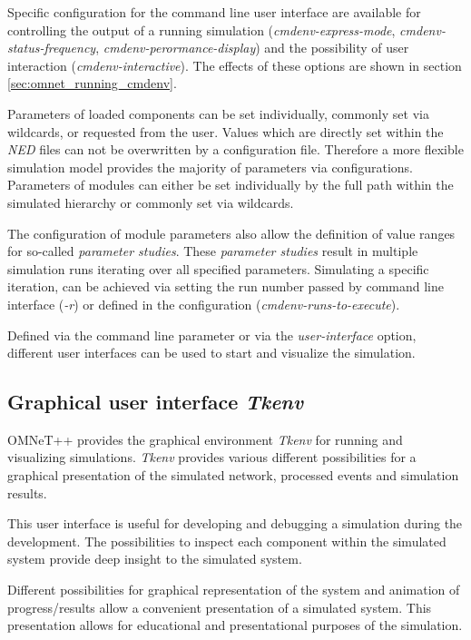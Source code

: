 Specific configuration for the command line user interface are available for controlling the output of a running simulation (\emph{cmdenv-express-mode}, \emph{cmdenv-status-frequency}, \emph{cmdenv-perormance-display}) and the possibility of user interaction (\emph{cmdenv-interactive}).
The effects of these options are shown in section \ref{sec:omnet_running_cmdenv}.

Parameters of loaded components can be set individually, commonly set via wildcards, or requested from the user.
Values which are directly set within the \emph{NED} files can not be overwritten by a configuration file.
Therefore a more flexible simulation model provides the majority of parameters via configurations.
Parameters of modules can either be set individually by the full path within the simulated hierarchy or commonly set via wildcards. \cite[section 9.3]{omnet_manual}

\begin{sloppypar}
The configuration of module parameters also allow the definition of value ranges for so-called \emph{parameter studies}.
These \emph{parameter studies} result in multiple simulation runs iterating over all specified parameters.
Simulating a specific iteration, can be achieved via setting the run number passed by command line interface (\emph{-r}) or defined in the configuration (\mbox{\emph{cmdenv-runs-to-execute}}). \cite[section 9.4]{omnet_manual}
\end{sloppypar}

Defined via the command line parameter or via the \emph{user-interface} option, different user interfaces can be used to start and visualize the simulation.

\subsection{Graphical user interface \emph{Tkenv}}
\label{sec:omnet_running_tkenv}
OMNeT++ provides the graphical environment \emph{Tkenv} for running and visualizing simulations.
\emph{Tkenv} provides various different possibilities for a graphical presentation of the simulated network, processed events and simulation results.

This user interface is useful for developing and debugging a simulation during the development.
The possibilities to inspect each component within the simulated system provide deep insight to the simulated system.

Different possibilities for graphical representation of the system and animation of progress/results allow a convenient presentation of a simulated system.
This presentation allows for educational and presentational purposes of the simulation. \cite[section 7.1]{omnet_user_guide}

